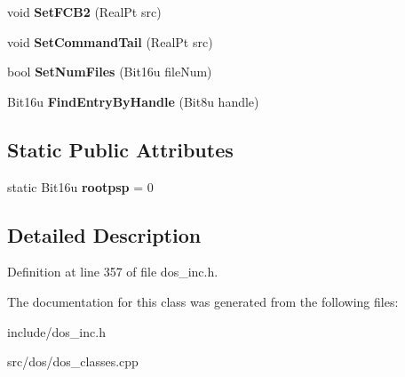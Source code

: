 \begin{DoxyCompactItemize}
\item 
\hypertarget{classDOS__PSP_a4c0066046f23c2d51f36da5f31749299}{void {\bfseries Set\-F\-C\-B2} (Real\-Pt src)}\label{classDOS__PSP_a4c0066046f23c2d51f36da5f31749299}

\item 
\hypertarget{classDOS__PSP_a513c55126b7b22f3fa587f005cbade46}{void {\bfseries Set\-Command\-Tail} (Real\-Pt src)}\label{classDOS__PSP_a513c55126b7b22f3fa587f005cbade46}

\item 
\hypertarget{classDOS__PSP_ac5a10428bbb82e178e67350935882c76}{bool {\bfseries Set\-Num\-Files} (Bit16u file\-Num)}\label{classDOS__PSP_ac5a10428bbb82e178e67350935882c76}

\item 
\hypertarget{classDOS__PSP_a94aa51f3b9eef379d2fbcaf025206a86}{Bit16u {\bfseries Find\-Entry\-By\-Handle} (Bit8u handle)}\label{classDOS__PSP_a94aa51f3b9eef379d2fbcaf025206a86}

\end{DoxyCompactItemize}
\subsection*{Static Public Attributes}
\begin{DoxyCompactItemize}
\item 
\hypertarget{classDOS__PSP_ad46b74f756dae06941329a205ab482fd}{static Bit16u {\bfseries rootpsp} = 0}\label{classDOS__PSP_ad46b74f756dae06941329a205ab482fd}

\end{DoxyCompactItemize}


\subsection{Detailed Description}


Definition at line 357 of file dos\-\_\-inc.\-h.



The documentation for this class was generated from the following files\-:\begin{DoxyCompactItemize}
\item 
include/dos\-\_\-inc.\-h\item 
src/dos/dos\-\_\-classes.\-cpp\end{DoxyCompactItemize}
